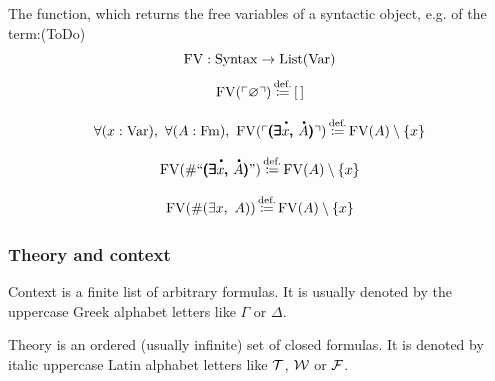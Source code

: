 \begin{metadefinition}
The function, which returns the free variables of a syntactic object, e.g. of the term:(ToDo)
\[
\mathrm{FV} : \text{Syntax} \to \mathrm{List}(\mathrm{Var})
\]
\[
\mathrm{FV}(\ulcorner\varnothing\urcorner)\,{\stackrel{{\textrm{def.}}}{\coloneqq}}\, [\,]
\]%

\[
\forall (x:\Var),\ %
\forall (A:\Fm),\ %
\FV(\ulcorner\boldexists{ \meta{ x } }{\meta{ A } }\urcorner)\eqdef \FV(A)\setminus\{x\}
\]%

\[
\FV(\#``\boldexists{ \meta{ x } }{\meta{ A } }")\eqdef \FV(A)\setminus\{x\}
\]

\[
\mathrm{FV}(\#(\exists x,\ A))\,{\stackrel{{\textrm{def.}}}{\coloneqq}}\, \mathrm{FV}(A)\setminus\{x\}
\]

\subsubsection{Theory and context}
\begin{definition}[context]%
Context is a finite list of arbitrary formulas. It is usually denoted by the uppercase Greek alphabet letters like $\Gamma$ or $\Delta$.
\end{definition}
\begin{definition}[theory]%
Theory is an ordered (usually infinite) set of closed formulas. It is denoted by italic uppercase Latin alphabet letters like $\mathcal{T}$, ${\mathcal{W}}$ or ${\mathcal{F}}$.
\end{definition}






\end{metadefinition}
